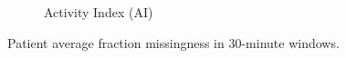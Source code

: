 \documentclass[12pt]{amsart}
\begin{document}
\begin{figure}[!th]
\begin{subfigure}{.5\textwidth}
  \caption{Activity Index (AI)
}  \label{fig:missing_acc}
\end{subfigure}
\caption{Patient average fraction missingness in 30-minute windows.}
\label{fig:mean_edacc}
\end{figure}

\newpage


\end{document}
